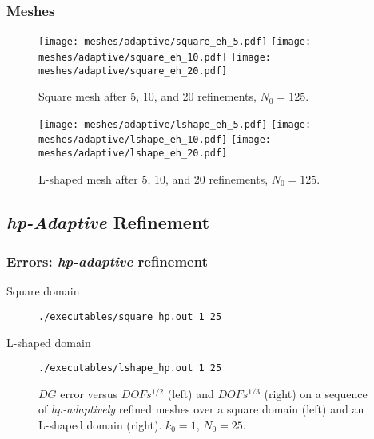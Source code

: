 \begin{frame}
    \frametitle{Meshes}

    \begin{figure}[!ht]
        \centering
        \texttt{[image: meshes/adaptive/square\_eh\_5.pdf]}
        \texttt{[image: meshes/adaptive/square\_eh\_10.pdf]}
        \texttt{[image: meshes/adaptive/square\_eh\_20.pdf]}
        \caption{Square mesh after 5, 10, and 20 refinements, $N_0 = 125$.}
    \end{figure}
    
    \begin{figure}[!ht]
        \centering
        \texttt{[image: meshes/adaptive/lshape\_eh\_5.pdf]}
        \texttt{[image: meshes/adaptive/lshape\_eh\_10.pdf]}
        \texttt{[image: meshes/adaptive/lshape\_eh\_20.pdf]}
        \caption{L-shaped mesh after 5, 10, and 20 refinements, $N_0 = 125$.}
    \end{figure}
\end{frame}

\subsection{\textit{hp-Adaptive} Refinement}

\begin{frame}[fragile]
    \frametitle{Errors: \textit{hp-adaptive} refinement}

    \begin{description}
        \item[Square domain] \lstinline{./executables/square_hp.out 1 25}
        \item[L-shaped domain] \lstinline{./executables/lshape_hp.out 1 25}
    \end{description}

    \begin{figure}[!ht]
        
        \caption{$DG$ error versus $DOFs^{1/2}$ (left) and $DOFs^{1/3}$ (right) on a sequence of \textit{hp-adaptively} refined meshes over a square domain (left) and an L-shaped domain (right). $k_0 = 1$, $N_0 = 25$.}
    \end{figure}
\end{frame}

